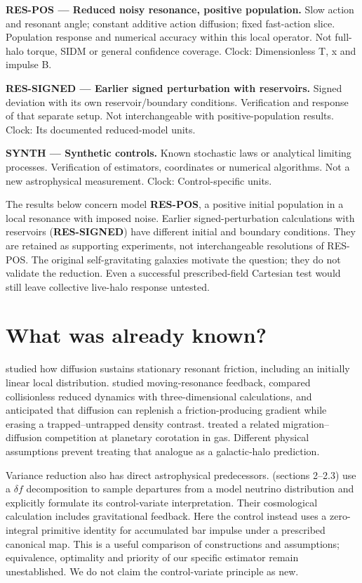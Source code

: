 \documentclass[fleqn,usenatbib]{mnras}
\begin{document}
\textbf{RES-POS --- Reduced noisy resonance, positive population.} Slow action and resonant angle; constant additive action diffusion; fixed fast-action slice. Population response and numerical accuracy within this local operator. Not full-halo torque, SIDM or general confidence coverage. Clock: Dimensionless T, x and impulse B.

\textbf{RES-SIGNED --- Earlier signed perturbation with reservoirs.} Signed deviation with its own reservoir/boundary conditions. Verification and response of that separate setup. Not interchangeable with positive-population results. Clock: Its documented reduced-model units.

\textbf{SYNTH --- Synthetic controls.} Known stochastic laws or analytical limiting processes. Verification of estimators, coordinates or numerical algorithms. Not a new astrophysical measurement. Clock: Control-specific units.

The results below concern model \textbf{RES-POS}, a positive initial population in a local resonance with imposed noise. Earlier signed-perturbation calculations with reservoirs (\textbf{RES-SIGNED}) have different initial and boundary conditions. They are retained as supporting experiments, not interchangeable resolutions of RES-POS. The original self-gravitating galaxies motivate the question; they do not validate the reduction. Even a successful prescribed-field Cartesian test would still leave collective live-halo response untested.

\section{What was already known?}\label{previous-work}

\citet{Hamilton2023} studied how diffusion sustains stationary resonant friction, including an initially linear local distribution. \citet{Chiba2023} studied moving-resonance feedback, compared collisionless reduced dynamics with three-dimensional calculations, and anticipated that diffusion can replenish a friction-producing gradient while erasing a trapped--untrapped density contrast. \citet{OgilvieLubow2006} treated a related migration--diffusion competition at planetary corotation in gas. Different physical assumptions prevent treating that analogue as a galactic-halo prediction.

Variance reduction also has direct astrophysical predecessors. \citet{Elbers2021} (sections 2--2.3) use a \(\delta f\) decomposition to sample departures from a model neutrino distribution and explicitly formulate its control-variate interpretation. Their cosmological calculation includes gravitational feedback. Here the control instead uses a zero-integral primitive identity for accumulated bar impulse under a prescribed canonical map. This is a useful comparison of constructions and assumptions; equivalence, optimality and priority of our specific estimator remain unestablished. We do not claim the control-variate principle as new.
\end{document}

